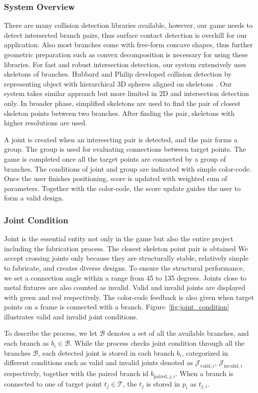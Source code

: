 \subsubsection*{System Overview}
There are many collision detection libraries available, however, our game needs to detect intersected branch pairs, thus surface contact detection is overkill for our application.
Also most branches come with free-form concave shapes, thus further geometric preparation such as convex decomposition is necessary for using these libraries.
For fast and robust intersection detection, our system extensively uses skeletons of branches.
Hubbard and Philip developed collision detection by representing object with hierarchical 3D spheres aligned on skeletons \cite{Hubbard:1996:APS:231731.231732}.
Our system takes similar approach but more limited in 2D and intersection detection only.
In broader phase, simplified skeletons are used to find the pair of closest skeleton points between two branches.
After finding the pair, skeletons with higher resolutions are used.

A joint is created when an intersecting pair is detected, and the pair forms a group.
The group is used for evaluating connections between target points.
The game is completed once all the target points are connected by a group of branches.
The conditions of joint and group are indicated with simple color-code.
Once the user finishes positioning, score is updated with weighted sum of parameters.
Together with the color-code, the score update guides the user to form a valid design.

\subsubsection*{Joint Condition}
Joint is the essential entity not only in the game but also the entire project including the fabrication process.
The closest skeleton point pair is obtained
We accept crossing joints only because they are structurally stable, relatively simple to fabricate, and creates diverse designs.
To ensure the structural performance, we set a connection angle within a range from 45 to 135 degrees.
Joints close to metal fixtures are also counted as invalid.
Valid and invalid joints are displayed with green and red respectively.
The color-code feedback is also given when target points on a frame is connected with a branch.
Figure~\ref{fig:joint_condition} illustrates valid and invalid joint conditions.


To describe the process, we let $\mathcal{B}$ denotes a set of all the available branches, and each branch as $ b_i \in \mathcal{B}$.
While the process checks joint condition through all the branches $\mathcal{B}$, each detected joint is stored in each branch $b_i$, categorized in different conditions such as valid and invalid joints denoted as
$\mathcal{J}_{\text{valid},i}$,
$\mathcal{J}_{\text{invalid},i}$ respectively, together with the paired branch id $b_{\text{paired},j, i}$.
When a branch is connected to one of target point $t_j \in \mathcal{T} $, the $t_j$ is stored in $p_i$ as $t_{j,i}$.


